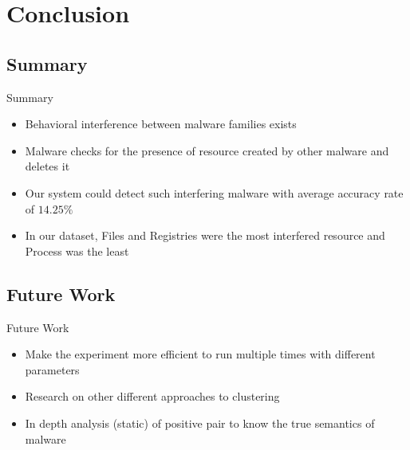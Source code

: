 \documentclass[]{beamer}
\begin{document}
\section{Conclusion}
\subsection{Summary}
\label{sub:Summary}
\begin{frame}{Summary}
  \begin{itemize}
    \item Behavioral interference between malware families exists
    \item Malware checks for the presence of resource created by other malware and deletes it
    \item Our system could detect such interfering malware with average accuracy rate of $14.25\%$
    \item In our dataset, Files and Registries were the most interfered resource and Process was the least
  \end{itemize}
\end{frame}
\subsection{Future Work}
\label{sub:Future Work}
\begin{frame}{Future Work}
  \begin{itemize}
    \item Make the experiment more efficient to run multiple times with different parameters
    \item Research on other different approaches to clustering
    \item In depth analysis (static) of positive pair to know the true semantics of malware
  \end{itemize}
\end{frame}
\end{document}
